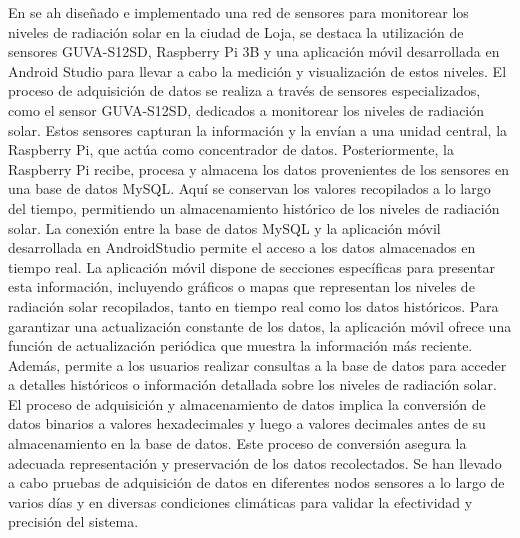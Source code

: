 \bigbreak
En \cite{orozco_jaramillo_diseno_2019} se ah diseñado e implementado una red de sensores para monitorear los niveles de radiación solar en la ciudad de Loja, se destaca la utilización de sensores GUVA-S12SD, Raspberry Pi 3B y una aplicación móvil desarrollada en Android Studio para llevar a cabo la medición y visualización de estos niveles. El proceso de adquisición de datos se realiza a través de sensores especializados, como el sensor GUVA-S12SD, dedicados a monitorear los niveles de radiación solar. Estos sensores capturan la información y la envían a una unidad central, la Raspberry Pi, que actúa como concentrador de datos. Posteriormente, la Raspberry Pi recibe, procesa y almacena los datos provenientes de los sensores en una base de datos MySQL. Aquí se conservan los valores recopilados a lo largo del tiempo, permitiendo un almacenamiento histórico de los niveles de radiación solar. La conexión entre la base de datos MySQL y la aplicación móvil desarrollada en AndroidStudio permite el acceso a los datos almacenados en tiempo real. La aplicación móvil dispone de secciones específicas para presentar esta información, incluyendo gráficos o mapas que representan los niveles de radiación solar recopilados, tanto en tiempo real como los datos históricos. Para garantizar una actualización constante de los datos, la aplicación móvil ofrece una función de actualización periódica que muestra la información más reciente. Además, permite a los usuarios realizar consultas a la base de datos para acceder a detalles históricos o información detallada sobre los niveles de radiación solar. El proceso de adquisición y almacenamiento de datos implica la conversión de datos binarios a valores hexadecimales y luego a valores decimales antes de su almacenamiento en la base de datos. Este proceso de conversión asegura la adecuada representación y preservación de los datos recolectados. Se han llevado a cabo pruebas de adquisición de datos en diferentes nodos sensores a lo largo de varios días y en diversas condiciones climáticas para validar la efectividad y precisión del sistema.

